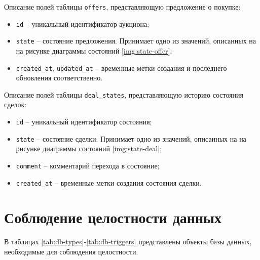 Описание полей таблицы \texttt{offers}, представляющую предложение о покупке:
\begin{itemize}
    \item \texttt{id} -- уникальный идентификатор аукциона;
    \item \texttt{state} -- состояние предложения. Принимает одно из значений, описанных на на рисунке диаграммы состояний \ref{img:state-offer};
    \item \texttt{created\_at}, \texttt{updated\_at} -- временные метки создания и последнего обновления соответственно.
\end{itemize}

Описание полей таблицы \texttt{deal\_states}, представляющую историю состояния сделок:
\begin{itemize}
    \item \texttt{id} -- уникальный идентификатор состояния;
    \item \texttt{state} -- состояние сделки. Принимает одно из значений, описанных на на рисунке диаграммы состояний \ref{img:state-deal};
    \item \texttt{comment} -- комментарий перехода в состояние;
    \item \texttt{created\_at} -- временные метки создания состояния сделки.
\end{itemize}

\section{Соблюдение целостности данных}

В таблицах \ref{tab:db-types}-\ref{tab:db-triggers} представлены объекты базы данных,  необходимые для соблюдения целостности.

